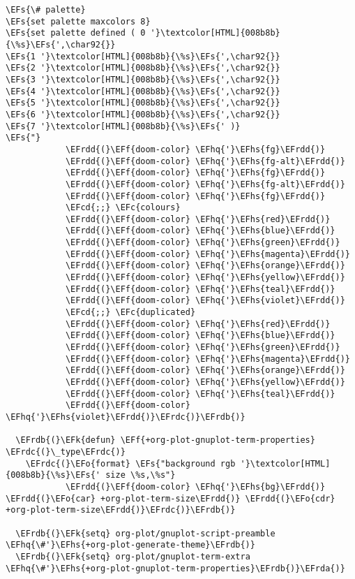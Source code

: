 \documentclass{article}
\newcommand{\EFc}[1]{\textcolor{EFc}{#1}} %
\newcommand{\EFcd}[1]{\textcolor{EFcd}{#1}} %
\newcommand{\EFs}[1]{\textcolor{EFs}{#1}} %
\newcommand{\EFk}[1]{\textcolor{EFk}{#1}} %
\newcommand{\EFf}[1]{\textcolor{EFf}{#1}} %
\newcommand{\EFo}[1]{\textcolor{EFo}{#1}} %
\newcommand{\EFhq}[1]{#1} %
\newcommand{\EFhs}[1]{\textcolor{EFhs}{#1}} %
\newcommand{\EFrda}[1]{\textcolor{EFrda}{#1}} %
\newcommand{\EFrdb}[1]{\textcolor{EFrdb}{#1}} %
\newcommand{\EFrdc}[1]{\textcolor{EFrdc}{#1}} %
\newcommand{\EFrdd}[1]{\textcolor{EFrdd}{#1}} %
\begin{document}
\begin{Code}
\begin{Verbatim}
\EFs{\# palette}
\EFs{set palette maxcolors 8}
\EFs{set palette defined ( 0 '}\textcolor[HTML]{008b8b}{\%s}\EFs{',\char92{}}
\EFs{1 '}\textcolor[HTML]{008b8b}{\%s}\EFs{',\char92{}}
\EFs{2 '}\textcolor[HTML]{008b8b}{\%s}\EFs{',\char92{}}
\EFs{3 '}\textcolor[HTML]{008b8b}{\%s}\EFs{',\char92{}}
\EFs{4 '}\textcolor[HTML]{008b8b}{\%s}\EFs{',\char92{}}
\EFs{5 '}\textcolor[HTML]{008b8b}{\%s}\EFs{',\char92{}}
\EFs{6 '}\textcolor[HTML]{008b8b}{\%s}\EFs{',\char92{}}
\EFs{7 '}\textcolor[HTML]{008b8b}{\%s}\EFs{' )}
\EFs{"}
            \EFrdd{(}\EFf{doom-color} \EFhq{'}\EFhs{fg}\EFrdd{)}
            \EFrdd{(}\EFf{doom-color} \EFhq{'}\EFhs{fg-alt}\EFrdd{)}
            \EFrdd{(}\EFf{doom-color} \EFhq{'}\EFhs{fg}\EFrdd{)}
            \EFrdd{(}\EFf{doom-color} \EFhq{'}\EFhs{fg-alt}\EFrdd{)}
            \EFrdd{(}\EFf{doom-color} \EFhq{'}\EFhs{fg}\EFrdd{)}
            \EFcd{;;} \EFc{colours}
            \EFrdd{(}\EFf{doom-color} \EFhq{'}\EFhs{red}\EFrdd{)}
            \EFrdd{(}\EFf{doom-color} \EFhq{'}\EFhs{blue}\EFrdd{)}
            \EFrdd{(}\EFf{doom-color} \EFhq{'}\EFhs{green}\EFrdd{)}
            \EFrdd{(}\EFf{doom-color} \EFhq{'}\EFhs{magenta}\EFrdd{)}
            \EFrdd{(}\EFf{doom-color} \EFhq{'}\EFhs{orange}\EFrdd{)}
            \EFrdd{(}\EFf{doom-color} \EFhq{'}\EFhs{yellow}\EFrdd{)}
            \EFrdd{(}\EFf{doom-color} \EFhq{'}\EFhs{teal}\EFrdd{)}
            \EFrdd{(}\EFf{doom-color} \EFhq{'}\EFhs{violet}\EFrdd{)}
            \EFcd{;;} \EFc{duplicated}
            \EFrdd{(}\EFf{doom-color} \EFhq{'}\EFhs{red}\EFrdd{)}
            \EFrdd{(}\EFf{doom-color} \EFhq{'}\EFhs{blue}\EFrdd{)}
            \EFrdd{(}\EFf{doom-color} \EFhq{'}\EFhs{green}\EFrdd{)}
            \EFrdd{(}\EFf{doom-color} \EFhq{'}\EFhs{magenta}\EFrdd{)}
            \EFrdd{(}\EFf{doom-color} \EFhq{'}\EFhs{orange}\EFrdd{)}
            \EFrdd{(}\EFf{doom-color} \EFhq{'}\EFhs{yellow}\EFrdd{)}
            \EFrdd{(}\EFf{doom-color} \EFhq{'}\EFhs{teal}\EFrdd{)}
            \EFrdd{(}\EFf{doom-color} \EFhq{'}\EFhs{violet}\EFrdd{)}\EFrdc{)}\EFrdb{)}

  \EFrdb{(}\EFk{defun} \EFf{+org-plot-gnuplot-term-properties} \EFrdc{(}\_type\EFrdc{)}
    \EFrdc{(}\EFo{format} \EFs{"background rgb '}\textcolor[HTML]{008b8b}{\%s}\EFs{' size \%s,\%s"}
            \EFrdd{(}\EFf{doom-color} \EFhq{'}\EFhs{bg}\EFrdd{)} \EFrdd{(}\EFo{car} +org-plot-term-size\EFrdd{)} \EFrdd{(}\EFo{cdr} +org-plot-term-size\EFrdd{)}\EFrdc{)}\EFrdb{)}

  \EFrdb{(}\EFk{setq} org-plot/gnuplot-script-preamble \EFhq{\#'}\EFhs{+org-plot-generate-theme}\EFrdb{)}
  \EFrdb{(}\EFk{setq} org-plot/gnuplot-term-extra \EFhq{\#'}\EFhs{+org-plot-gnuplot-term-properties}\EFrdb{)}\EFrda{)}


\end{Verbatim}
\end{Code}
\end{document}
